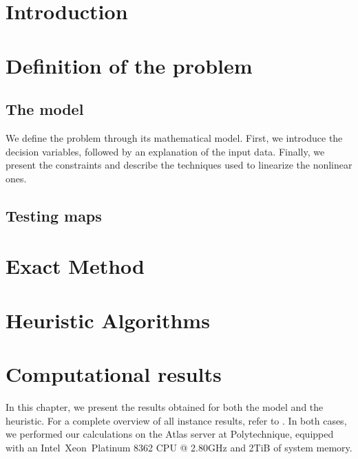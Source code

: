 \documentclass[a4paper,12pt]{report}
\begin{document}
\afterpreface
\chapter{Introduction}




%
%
\chapter{Definition of the problem}
\section{The model}\label{sec:modelDescription}
We define the problem through its mathematical model.
First, we introduce the decision variables, followed by an explanation of the input data.
Finally, we present the constraints and describe the techniques used to linearize the nonlinear ones.



\newpage

\newpage
\section{Testing maps}\label{sec:maps}



\chapter{Exact Method}\label{chap:ExactAlgo}

\chapter{Heuristic Algorithms}\label{chap:HeuristicAlgo}

\chapter{Computational results}\label{chap:results}
In this chapter, we present the results obtained for both the model and the heuristic.  
For a complete overview of all instance results, refer to \cite{Magi_Methods_for_Traffic_2025}.  
In both cases, we performed our calculations on the Atlas server at Polytechnique, equipped with an Intel\textregistered~Xeon\textregistered~Platinum 8362 CPU @ 2.80GHz and 2TiB of system memory.


\end{document}
